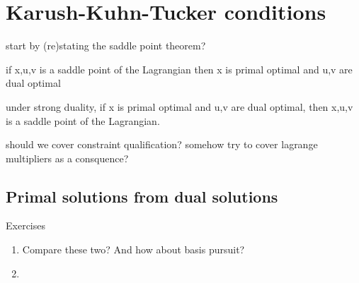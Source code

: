 \chapter{Karush-Kuhn-Tucker conditions}
\label{chap:kkt}

start by (re)stating the saddle point theorem?

if x,u,v is a saddle point of the Lagrangian then x is primal optimal and u,v
are dual optimal

under strong duality, if x is primal optimal and u,v are dual optimal, then
x,u,v is a saddle point of the Lagrangian.

should we cover constraint qualification? 
somehow try to cover lagrange multipliers as a consquence?

\section{Primal solutions from dual solutions}

\begin{xcb}{Exercises}
\begin{enumerate}[label=\thechapter.\arabic*]
\settowidth{\leftmargini}{00.00.\hskip\labelsep}
\item \label{ex:lasso_dantzig}
Compare these two? And how about basis pursuit?

\item \label{ex:simplex_projection}

\end{enumerate}
\end{xcb}